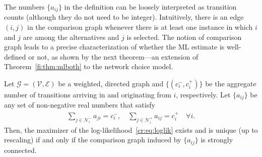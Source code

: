 The numbers $\{ a_{ij}\}$ in the definition can be loosely interpreted as transition counts (although they do not need to be integer).
Intuitively, there is an edge $(i, j)$ in the comparison graph whenever there is at least one instance in which $i$ and $j$ are among the alternatives and $j$ is selected.
The notion of comparison graph leads to a precise characterization of whether the ML estimate is well-defined or not, as shown by the next theorem---an extension of Theorem~\ref{fi:thm:mlboth} to the network choice model.

\begin{theorem}
\label{cr:thm:mlboth}
Let $\mathcal{G} = (\mathcal{V}, \mathcal{E})$ be a weighted, directed graph and $\{ (c^-_i, c^+_i) \}$ be the aggregate number of transitions arriving in and originating from $i$, respectively.
Let $\{ a_{ij} \}$ be any set of non-negative real numbers that satisfy
\begin{align*}
\sum_{j \in \mathcal{N}^-_i} a_{ji} = c^-_i, \quad
\sum_{j \in \mathcal{N}^+_i} a_{ij} = c^+_i \quad \forall i.
\end{align*}
Then, the maximizer of the log-likelihood~\eqref{cr:eq:loglik} exists and is unique (up to rescaling) if and only if the comparison graph induced by $\{ a_{ij} \}$ is strongly connected.
\end{theorem}

